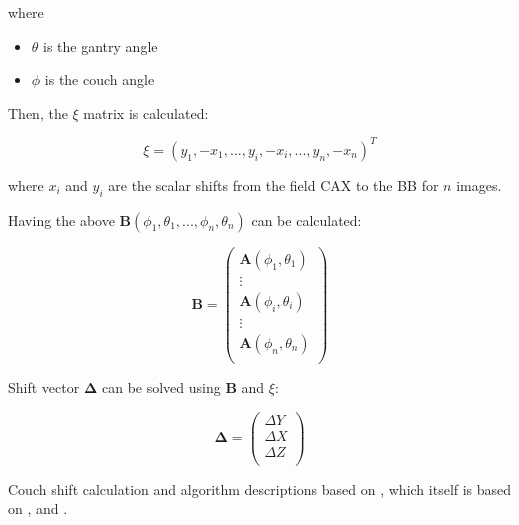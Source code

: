 where
\begin{itemize}
    \item $\theta$ is the gantry angle
    \item $\phi$ is the couch angle
\end{itemize}

Then, the $\xi$ matrix is calculated:

\begin{equation}
    \xi = (y_1, -x_1, ..., y_i, -x_i, ..., y_n, -x_n)^T
    \label{eq:cax_bb_shift_matrix}
\end{equation}

where $x_i$ and $y_i$ are the scalar shifts from the field CAX to the BB for $n$ images.

Having the above $\mathbf{B}(\phi_1, \theta_1, ...,\phi_n, \theta_n)$ can be calculated:

\begin{equation}
    \mathbf{B} = 
    \left(\begin{array}{c}
        \mathbf{A}(\phi_1, \theta_1) \\
        \vdots \\
        \mathbf{A}(\phi_i, \theta_i) \\
        \vdots \\
        \mathbf{A}(\phi_n, \theta_n) \\
    \end{array} \right)
\end{equation}

Shift vector $\mathbf{\Delta}$ can be solved using $\mathbf{B}$ and $\xi$:

\begin{equation}
    \mathbf{\Delta} = 
    \left(\begin{array}{c}
        \Delta Y \\
        \Delta X \\
        \Delta Z \\
    \end{array} \right)
\end{equation}

Couch shift calculation and algorithm descriptions based on \cite{pylinac_wl_algorithm}, which itself is based on \cite{winkler_et_al}, \cite{du_et_al} and \cite{low_et_al}.